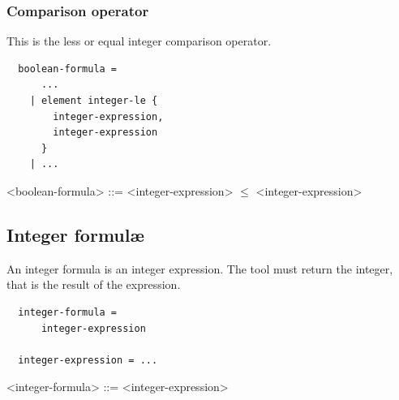 \documentclass[10pt,english,a4paper]{article}
\begin{document}
\subsubsection{Comparison operator}

This is the less or equal integer comparison operator.


\begin{multicols}{2}
\begin{lstlisting}
  boolean-formula =
      ...
    | element integer-le {
        integer-expression,
        integer-expression
      }
    | ...
\end{lstlisting}
\columnbreak
\begin{grammar}
<boolean-formula> ::= <integer-expression> $\leq$ <integer-expression>
\end{grammar}
\end{multicols}


\subsection{Integer formul{\ae}}

An integer formula is an integer expression.
The tool must return the integer, that is the result of the expression.

\begin{multicols}{2}
\begin{lstlisting}
  integer-formula =
      integer-expression

  integer-expression = ...
\end{lstlisting}
\columnbreak
\begin{grammar}
<integer-formula> ::= <integer-expression>
\end{grammar}
\end{multicols}
\end{document}
